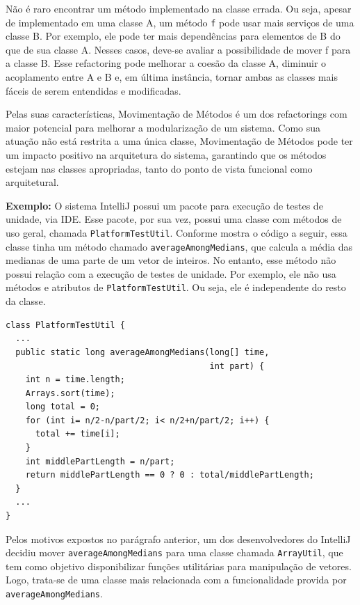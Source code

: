 \documentclass[
  11pt,
  twoside]{book}
\newcommand{\passthrough}[1]{#1}
\begin{document}

Não é raro encontrar um método implementado na classe errada. Ou seja,
apesar de implementado em uma classe A, um método
\passthrough{\lstinline!f!} pode usar mais serviços de uma classe B. Por
exemplo, ele pode ter mais dependências para elementos de B do que de
sua classe A. Nesses casos, deve-se avaliar a possibilidade de mover f
para a classe B. Esse refactoring pode melhorar a coesão da classe A,
diminuir o acoplamento entre A e B e, em última instância, tornar ambas
as classes mais fáceis de serem entendidas e modificadas.

Pelas suas características, Movimentação de Métodos é um dos
refactorings com maior potencial para melhorar a modularização de um
sistema. Como sua atuação não está restrita a uma única classe,
Movimentação de Métodos pode ter um impacto positivo na arquitetura do
sistema, garantindo que os métodos estejam nas classes apropriadas,
tanto do ponto de vista funcional como arquitetural.

\textbf{Exemplo:} O sistema IntelliJ possui um pacote para execução de
testes de unidade, via IDE. Esse pacote, por sua vez, possui uma classe
com métodos de uso geral, chamada
\passthrough{\lstinline!PlatformTestUtil!}. Conforme mostra o código a
seguir, essa classe tinha um método chamado
\passthrough{\lstinline!averageAmongMedians!}, que calcula a média das
medianas de uma parte de um vetor de inteiros. No entanto, esse método
não possui relação com a execução de testes de unidade. Por exemplo, ele
não usa métodos e atributos de
\passthrough{\lstinline!PlatformTestUtil!}. Ou seja, ele é independente
do resto da classe.

\begin{lstlisting}
class PlatformTestUtil {
  ...
  public static long averageAmongMedians(long[] time, 
                                         int part) {
    int n = time.length;
    Arrays.sort(time);
    long total = 0;
    for (int i= n/2-n/part/2; i< n/2+n/part/2; i++) {
      total += time[i];
    }
    int middlePartLength = n/part;
    return middlePartLength == 0 ? 0 : total/middlePartLength;
  }
  ...
}
\end{lstlisting}

Pelos motivos expostos no parágrafo anterior, um dos desenvolvedores do
IntelliJ decidiu mover \passthrough{\lstinline!averageAmongMedians!}
para uma classe chamada \passthrough{\lstinline!ArrayUtil!}, que tem
como objetivo disponibilizar funções utilitárias para manipulação de
vetores. Logo, trata-se de uma classe mais relacionada com a
funcionalidade provida por
\passthrough{\lstinline!averageAmongMedians!}.
\end{document}
